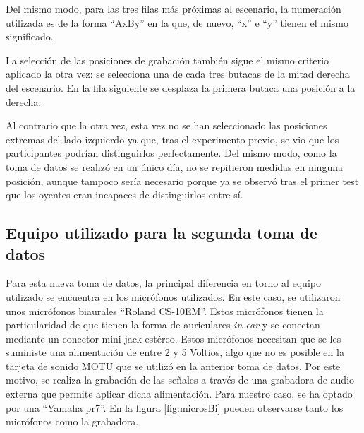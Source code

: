 \documentclass[11pt,a4paper,twoside]{book}
\begin{document}
            Del mismo modo, para las tres filas más próximas al escenario, la numeración utilizada es de la forma ``AxBy'' en la que, de nuevo, ``x'' e ``y'' tienen el mismo significado.\newline
                
            La selección de las posiciones de grabación también sigue el mismo criterio aplicado la otra vez: se selecciona una de cada tres butacas de la mitad derecha del escenario. En la fila siguiente se desplaza la primera butaca una posición a la derecha.
                
            Al contrario que la otra vez, esta vez no se han seleccionado las posiciones extremas del lado izquierdo ya que, tras el experimento previo, se vio que los participantes podrían distinguirlos perfectamente. Del mismo modo, como la toma de datos se realizó en un único día, no se repitieron medidas en ninguna posición, aunque tampoco sería necesario porque ya se observó tras el primer test que los oyentes eran incapaces de distinguirlos entre sí.
                
                
        \subsection{Equipo utilizado para la segunda toma de datos}
            Para esta nueva toma de datos, la principal diferencia en torno al equipo utilizado se encuentra en los micrófonos utilizados. En este caso, se utilizaron unos micrófonos biaurales ``Roland CS-10EM''. Estos micrófonos tienen la particularidad de que tienen la forma de auriculares \textit{in-ear} y se conectan mediante un conector mini-jack estéreo. Estos micrófonos necesitan que se les suministe una alimentación de entre 2 y 5 Voltios, algo que no es posible en la tarjeta de sonido MOTU que se utilizó en la anterior toma de datos. Por este motivo, se realiza la grabación de las señales a través de una grabadora de audio externa que permite aplicar dicha alimentación. Para nuestro caso, se ha optado por una ``Yamaha pr7''. En la figura \ref{fig:microsBi} pueden observarse tanto los micrófonos como la grabadora.
                
\end{document}
